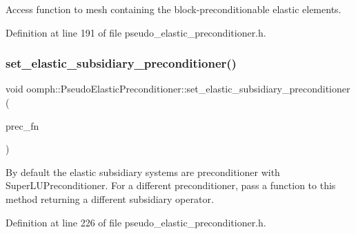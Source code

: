 Access function to mesh containing the block-\/preconditionable elastic elements. 



Definition at line 191 of file pseudo\+\_\+elastic\+\_\+preconditioner.\+h.

\mbox{\label{classoomph_1_1PseudoElasticPreconditioner_a8c75fe5786d64a042056df16a062c055}} 
\subsubsection{\texorpdfstring{set\+\_\+elastic\+\_\+subsidiary\+\_\+preconditioner()}{set\_elastic\_subsidiary\_preconditioner()}}
{\footnotesize\ttfamily void oomph\+::\+Pseudo\+Elastic\+Preconditioner\+::set\+\_\+elastic\+\_\+subsidiary\+\_\+preconditioner (\begin{DoxyParamCaption}\item[{\hyperlink{classoomph_1_1PseudoElasticPreconditioner_a1462e1ef48ed2668c06dfd36c783d1a5}{Subsidiary\+Preconditioner\+Fct\+Pt}}]{prec\+\_\+fn }\end{DoxyParamCaption})\hspace{0.3cm}{\ttfamily [inline]}}



By default the elastic subsidiary systems are preconditioner with Super\+L\+U\+Preconditioner. For a different preconditioner, pass a function to this method returning a different subsidiary operator. 



Definition at line 226 of file pseudo\+\_\+elastic\+\_\+preconditioner.\+h.

\mbox{\label{classoomph_1_1PseudoElasticPreconditioner_a6030c2461383ee1a0b8ac6ed56b0daf6}} 
